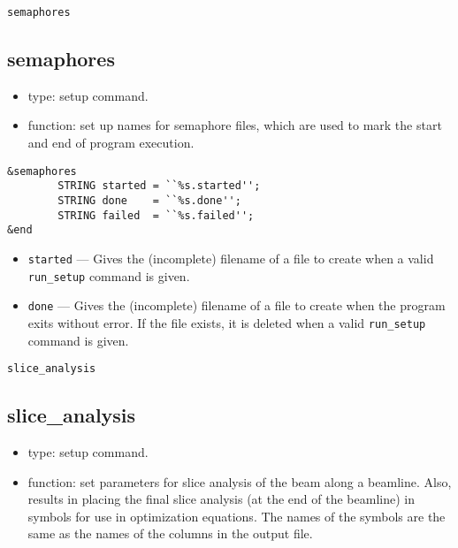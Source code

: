 \documentclass[11pt]{article}
\begin{document}
\begin{latexonly}
\newpage
\begin{center}{\Large\verb|semaphores|}\end{center}
\end{latexonly}
\subsection{semaphores \label{subsec:semaphores}}

\begin{itemize}
\item type: setup command.
\item function: set up names for semaphore files, which are used to mark the
        start and end of program execution.
\end{itemize}

\begin{verbatim}
&semaphores
        STRING started = ``%s.started'';
        STRING done    = ``%s.done'';
        STRING failed  = ``%s.failed'';
&end
\end{verbatim}

\begin{itemize}
\item {\tt started} --- Gives the (incomplete) filename of a file to create when a valid
        {\tt run\_setup} command is given.
\item {\tt done} --- Gives the (incomplete) filename of a file to create when the program
        exits without error.  If the file exists, it is deleted when a valid {\tt run\_setup}
        command is given.
\end{itemize}

\begin{latexonly}
\newpage
\begin{center}{\Large\verb|slice_analysis|}\end{center}
\end{latexonly}
\subsection{slice\_analysis \label{subsec:sliceanalysis}}

\begin{itemize}
\item type: setup command.
\item function: set parameters for slice analysis of the beam along a
	beamline.  Also, results in placing the final slice analysis
        (at the end of the beamline) in symbols for use in optimization
        equations.  The names of the symbols are the same as the names
        of the columns in the output file.
\end{itemize}
\end{document}

